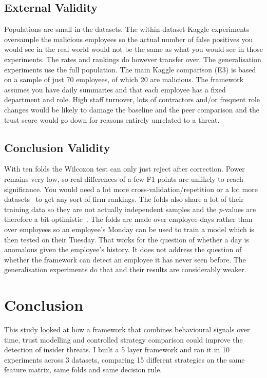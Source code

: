 \documentclass[a4paper,12pt]{article}
\begin{document}
\subsection{External Validity}
\label{sec:10.3}

Populations are small in the datasets. The within-dataset Kaggle experiments oversample the malicious employees so the actual number of false positives you would see in the real world would not be the same as what you would see in those experiments. The rates and rankings do however transfer over. The generalisation experiments use the full population. The main Kaggle comparison (E3) is based on a sample of just 70 employees, of which 20 are malicious. The framework assumes you have daily summaries and that each employee has a fixed department and role. High staff turnover, lots of contractors and/or frequent role changes would be likely to damage the baseline and the peer comparison and the trust score would go down for reasons entirely unrelated to a threat.

\subsection{Conclusion Validity}
\label{sec:10.4}

With ten folds the Wilcoxon test can only just reject after correction. Power remains very low, so real differences of a few F1 points are unlikely to reach significance. You would need a lot more cross-validation/repetition or a lot more datasets~\cite{demsar2006} to get any sort of firm rankings. The folds also share a lot of their training data so they are not actually independent samples and the \emph{p}-values are therefore a bit optimistic~\cite{nadeau2003}. The folds are made over employee-days rather than over employees so an employee's Monday can be used to train a model which is then tested on their Tuesday. That works for the question of whether a day is anomalous given the employee's history. It does not address the question of whether the framework can detect an employee it has never seen before. The generalisation experiments do that and their results are considerably weaker.

\section{Conclusion}
\label{sec:11}

This study looked at how a framework that combines behavioural signals over time, trust modelling and controlled strategy comparison could improve the detection of insider threats. I built a 5 layer framework and ran it in 10 experiments across 3 datasets, comparing 15 different strategies on the same feature matrix, same folds and same decision rule.
\end{document}
